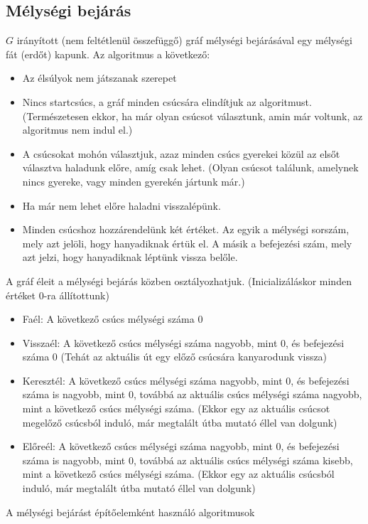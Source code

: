 \documentclass[margin=0px]{article}
\begin{document}
\subsection{Mélységi bejárás}
$G$ irányított (nem feltétlenül összefüggő) gráf mélységi bejárásával egy mélységi fát (erdőt) kapunk. Az algoritmus a következő:
\begin{itemize}
    \item Az élsúlyok nem játszanak szerepet
    \item Nincs startcsúcs, a gráf minden csúcsára elindítjuk az algoritmust. (Természetesen ekkor, ha már olyan csúcsot választunk, amin már voltunk, az algoritmus nem indul el.)
    \item A csúcsokat mohón választjuk, azaz minden csúcs gyerekei közül az elsőt választva haladunk előre, amíg csak lehet. (Olyan csúcsot találunk, amelynek nincs gyereke, vagy minden gyerekén jártunk már.)
    \item Ha már nem lehet előre haladni visszalépünk.
    \item Minden csúcshoz hozzárendelünk két értéket. Az egyik a mélységi sorszám, mely azt jelöli, hogy hanyadiknak értük el. A másik a befejezési szám, mely azt jelzi, hogy hanyadiknak léptünk vissza belőle.
\end{itemize}
A gráf éleit a mélységi bejárás közben osztályozhatjuk. (Inicializáláskor minden értéket 0-ra állítottunk)
\begin{itemize}
    \item Faél: A következő csúcs mélységi száma 0
    \item Visszaél: A következő csúcs mélységi száma nagyobb, mint 0, és befejezési száma 0 (Tehát az aktuális út egy előző csúcsára kanyarodunk vissza)
    \item Keresztél: A következő csúcs mélységi száma nagyobb, mint 0, és befejezési száma is nagyobb, mint 0, továbbá az aktuális csúcs mélységi száma nagyobb, mint a következő csúcs mélységi száma. (Ekkor egy az aktuális csúcsot megelőző csúcsból induló, már megtalált útba mutató éllel van dolgunk)
    \item Előreél: A következő csúcs mélységi száma nagyobb, mint 0, és befejezési száma is nagyobb, mint 0, továbbá az aktuális csúcs mélységi száma kisebb, mint a következő csúcs mélységi száma. (Ekkor egy az aktuális csúcsból induló, már megtalált útba mutató éllel van dolgunk)
\end{itemize}
A mélységi bejárást építőelemként használó algoritmusok
\end{document}
